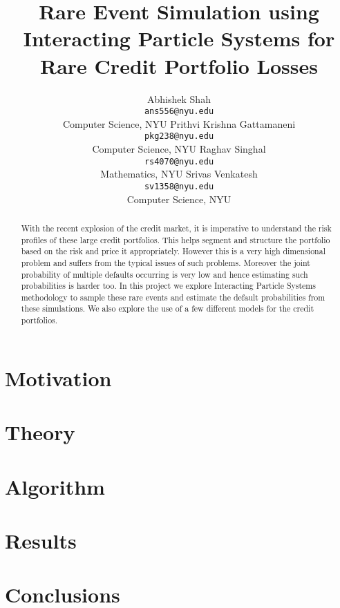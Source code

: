 \documentclass{article}
\title{Rare Event Simulation using Interacting Particle Systems for Rare Credit Portfolio Losses}
\author{
  Abhishek Shah \\
  \texttt{ans556@nyu.edu}\\
  Computer Science,  NYU
  \And
  Prithvi Krishna Gattamaneni\\
  \texttt{pkg238@nyu.edu}\\
  Computer Science,  NYU
  \AND
  Raghav Singhal\\
  \texttt{rs4070@nyu.edu}\\
  Mathematics, NYU
  \And
  Srivas Venkatesh \\
  \texttt{sv1358@nyu.edu} \\
  Computer Science,  NYU
}
\begin{document}
\maketitle

\begin{abstract}
	With the recent explosion of the credit market, it is imperative to understand
	the risk profiles of these large credit portfolios. This helps segment and
	structure the portfolio based on the risk and price it appropriately. However
	this is a very high dimensional problem and suffers from the typical issues
	of such problems. Moreover the joint probability of multiple defaults
	occurring is very low and hence estimating such probabilities is harder too.
	In this project we explore Interacting Particle Systems methodology to sample 
	these rare events and estimate the default probabilities from these simulations.
	We also explore the use of a few different models for the credit portfolios.
\end{abstract}
\section{Motivation}

\section{Theory}

\section{Algorithm}

\section{Results}

\section{Conclusions}


\clearpage
\nocite{code}

\end{document}
